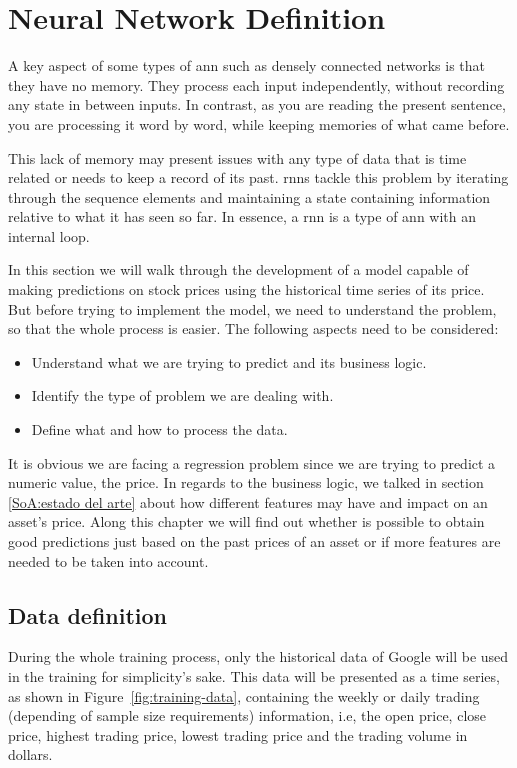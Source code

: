 \section{Neural Network Definition}
\label{NN definition}

A key aspect of some types of \gls{ann} such as densely connected networks is that they have no memory. They process each input independently, without recording any state in between inputs. In contrast, as you are reading the present sentence, you are processing it word by word, while keeping memories of what came before.\cite{deepWithPython}

This lack of memory may present issues with any type of data that is time related or needs to keep a record of its past. \glspl{rnn} tackle this problem by iterating through the sequence elements and maintaining a state containing information relative to what it has seen so far. In essence, a \gls{rnn} is a type of \gls{ann} with an internal loop.

In this section we will walk through the development of a model capable of making predictions on stock prices using the historical time series of its price. But before trying to implement the model, we need to understand the problem, so that the whole process is easier. The following aspects need to be considered:

\begin{itemize}
    \item Understand what we are trying to predict and its business logic.
    \item Identify the type of problem we are dealing with.
    \item Define what and how to process the data.
\end{itemize}

It is obvious we are facing a regression problem since we are trying to predict a numeric value, the price. In regards to the business logic, we talked in section \ref{SoA:estado del arte} about how different features may have and impact on an asset's price. Along this chapter we will find out whether is possible to obtain good predictions just based on the past prices of an asset or if more features are needed to be taken into account.

\subsection{Data definition}

During the whole training process, only the historical data of Google will be used in the training for simplicity's sake. This data will be presented as a time series, as shown in Figure~\ref{fig:training-data}, containing the weekly or daily trading (depending of sample size requirements) information, i.e, the open price, close price, highest trading price, lowest trading price and the trading volume in dollars.

